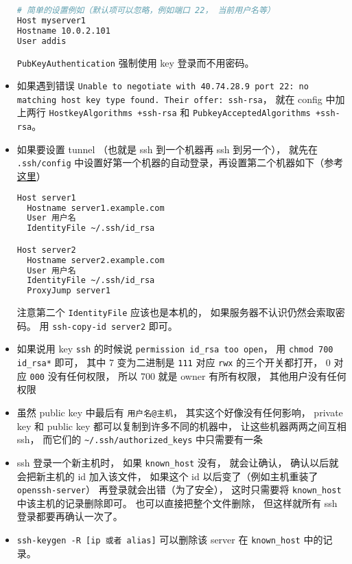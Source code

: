 \begin{itemize}
\begin{lstlisting}[language=bash]
# 简单的设置例如（默认项可以忽略，例如端口 22， 当前用户名等）
Host myserver1
Hostname 10.0.2.101
User addis
\end{lstlisting}
\verb|PubKeyAuthentication| 强制使用 key 登录而不用密码。

\item 如果遇到错误 \verb|Unable to negotiate with 40.74.28.9 port 22: no matching host key type found. Their offer: ssh-rsa|， 就在 config 中加上两行 \verb|HostkeyAlgorithms +ssh-rsa| 和 \verb|PubkeyAcceptedAlgorithms +ssh-rsa|。

\item 如果要设置 tunnel （也就是 ssh 到一个机器再 ssh 到另一个）， 就先在 \verb|.ssh/config| 中设置好第一个机器的自动登录，再设置第二个机器如下（参考\href{https://askubuntu.com/questions/311447/how-do-i-ssh-to-machine-a-via-b-in-one-command}{这里}）
\begin{lstlisting}[language=bash]
Host server1
  Hostname server1.example.com
  User 用户名
  IdentityFile ~/.ssh/id_rsa

Host server2
  Hostname server2.example.com
  User 用户名
  IdentityFile ~/.ssh/id_rsa
  ProxyJump server1
\end{lstlisting}
注意第二个 \verb|IdentityFile| 应该也是本机的， 如果服务器不认识仍然会索取密码。 用 \verb|ssh-copy-id server2| 即可。

\item 如果说用 key \verb`ssh` 的时候说 \verb`permission id_rsa too open`， 用 \verb`chmod 700 id_rsa*` 即可， 其中 7 变为二进制是 \verb`111` 对应 \verb`rwx` 的三个开关都打开， 0 对应 \verb`000` 没有任何权限， 所以 700 就是 owner 有所有权限， 其他用户没有任何权限
\item 虽然 public key 中最后有 \verb`用户名@主机`， 其实这个好像没有任何影响， private key 和 public key 都可以复制到许多不同的机器中， 让这些机器两两之间互相 ssh， 而它们的 \verb`~/.ssh/authorized_keys` 中只需要有一条
\item ssh 登录一个新主机时， 如果 \verb`known_host` 没有， 就会让确认， 确认以后就会把新主机的 id 加入该文件， 如果这个 id 以后变了（例如主机重装了 \verb`openssh-server`） 再登录就会出错（为了安全）， 这时只需要将 \verb`known_host` 中该主机的记录删除即可。 也可以直接把整个文件删除， 但这样就所有 ssh 登录都要再确认一次了。
\item \verb|ssh-keygen -R [ip 或者 alias]| 可以删除该 server 在 \verb|known_host| 中的记录。
\end{itemize}

